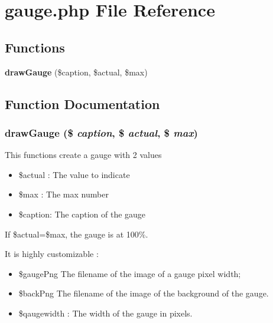 \section{gauge.php File Reference}
\label{gauge_8php}


\subsection*{Functions}
\begin{CompactItemize}
\item 
{\bf draw\-Gauge} (\$caption, \$actual, \$max)
\end{CompactItemize}


\subsection{Function Documentation}
\subsubsection{\setlength{\rightskip}{0pt plus 5cm}draw\-Gauge (\$ {\em caption}, \$ {\em actual}, \$ {\em max})}\label{gauge_8php_3c04d1c808721c741013f290fdf6a501}


This functions create a gauge with 2 values\begin{itemize}
\item \$actual : The value to indicate\item \$max : The max number\item \$caption: The caption of the gauge\end{itemize}


If \$actual=\$max, the gauge is at 100\%.

It is highly customizable :\begin{itemize}
\item \$gauge\-Png The filename of the image of a gauge pixel width;\item \$back\-Png The filename of the image of the background of the gauge.\end{itemize}


\begin{itemize}
\item \$qaugewidth : The width of the gauge in pixels. \end{itemize}
